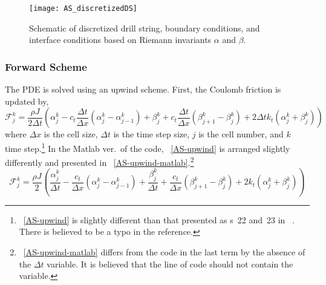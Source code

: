 \begin{figure}
	\centering
	\texttt{[image: AS\_discretizedDS]}
	\caption[Schematic of discretized drill string and boundary conditions]{Schematic of discretized drill string, boundary conditions, and interface conditions based on Riemann invariants $\alpha$ and $\beta$.}
	\label{AS_discretizeDS}
\end{figure}

\subsubsection{Forward Scheme}
The PDE is solved using an upwind scheme. First, the Coulomb friction is updated by,
\begin{equation}
    \label{AS-upwind}
    \mathcal{F}_{j}^k = \frac{\rho J}{2 \Delta t}\left(\alpha_j^k - c_t \frac{\Delta t}{\Delta x}(\alpha_j^k - \alpha_{j-1}^k) + \beta_j^k + c_t \frac{\Delta t}{\Delta x}(\beta_{j+1}^k-\beta_j^k) + 2{\Delta t} k_t (\alpha_j^k + \beta_j^k)\right)
\end{equation}
where $\Delta x$ is the cell size, $\Delta t$ is the time step size, $j$ is the cell number, and $k$ time step.\footnote{\equationname~\ref{AS-upwind} is slightly different than that presented as \equationname{}s~22 and~23 in ~\cite{ref:aarsnes2017a}.  There is believed to be a typo in the reference.}  In the Matlab ver.\ of the code, \equationname~\ref{AS-upwind} is arranged slightly differently and presented in \equationname~\ref{AS-upwind-matlab}.\footnote{\equationname~\ref{AS-upwind-matlab} differs from the code in the last term by the absence of the $\Delta t$ variable.  It is believed that the line of code  should not contain the  variable.}
\begin{equation}
    \label{AS-upwind-matlab}
    \mathcal{F}_{j}^k = \frac{\rho J}{2}\left(\frac{\alpha_j^k}{\Delta t} - \frac{c_t}{\Delta x}(\alpha_j^k - \alpha_{j-1}^k) + \frac{\beta_j^k}{\Delta t} + \frac{c_t}{\Delta x}(\beta_{j+1}^k-\beta_j^k) + 2 k_t (\alpha_j^k + \beta_j^k)\right)
\end{equation}

